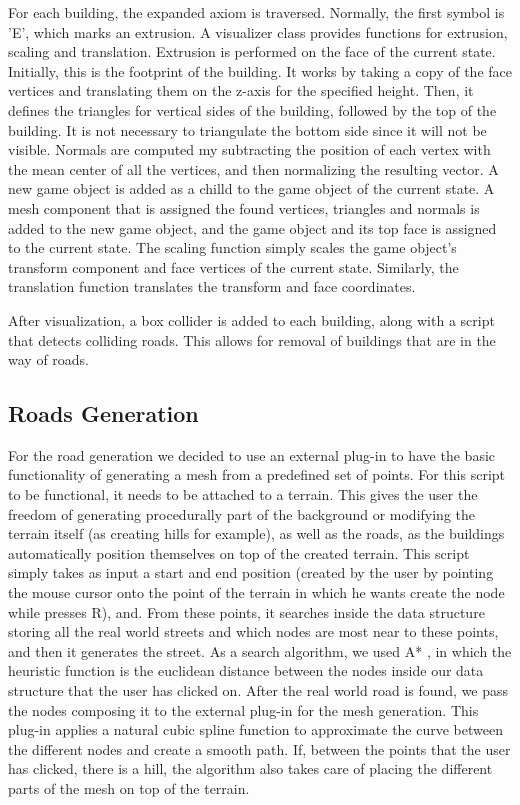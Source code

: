 \documentclass[conference]{IEEEtran}
\begin{document}
For each building, the expanded axiom is traversed. Normally, the first symbol is 'E', which marks an extrusion. A visualizer class provides functions for extrusion, scaling and translation. Extrusion is performed on the face of the current state. Initially, this is the footprint of the building. It works by taking a copy of the face vertices and translating them on the z-axis for the specified height. Then, it defines the triangles for vertical sides of the building, followed by the top of the building. It is not necessary to triangulate the bottom side since it will not be visible. Normals are computed my subtracting the position of each vertex with the mean center of all the vertices, and then normalizing the resulting vector. A new game object is added as a chilld to the game object of the current state. A mesh component that is assigned the found vertices, triangles and normals is added to the new game object, and the game object and its top face is assigned to the current state. The scaling function simply scales the game object's transform component and face vertices of the current state. Similarly, the translation function translates the transform and face coordinates.\newline

After visualization, a box collider is added to each building, along with a script that detects colliding roads. This allows for removal of buildings that are in the way of roads.

\subsection{Roads Generation}

For the road generation we decided to use an external plug-in \cite{plugin} to have the basic functionality of generating a mesh from a predefined set of points. For this script to be functional, it needs to be attached to a terrain. This gives the user the freedom of generating procedurally part of the background or modifying the terrain itself (as creating hills for example), as well as the roads, as the buildings automatically position themselves on top of the created terrain. This script simply takes as input a start and end position (created by the user by pointing the mouse cursor onto the point of the terrain in which he wants create the node while presses R), and. From these points, it searches inside the data structure storing all the real world streets and which nodes are most near to these points, and then it generates the street. As a search algorithm, we used A* , in which the heuristic function is the euclidean distance between the nodes  inside our data structure that the user has clicked on. After the real world road is found, we pass the nodes composing it to the external plug-in for the mesh generation. This plug-in applies a natural cubic spline \cite{spline} function to approximate the curve between the different nodes and create a smooth path.
If, between the points that the user has clicked, there is a hill, the algorithm also takes care of placing the different parts of the mesh on top of the terrain.
\end{document}
